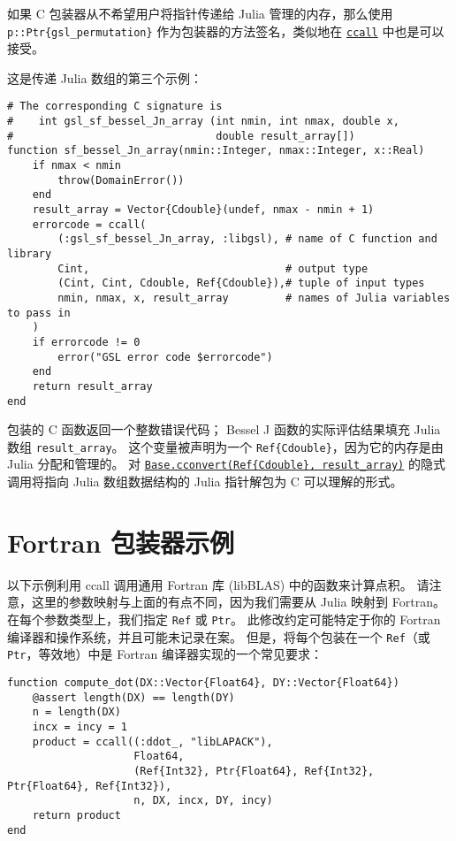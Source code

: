 如果 C 包装器从不希望用户将指针传递给 Julia 管理的内存，那么使用 \texttt{p::Ptr\{gsl\_permutation\}} 作为包装器的方法签名，类似地在 \hyperlink{14245046751182637566}{\texttt{ccall}} 中也是可以接受。



这是传递 Julia 数组的第三个示例：




\begin{verbatim}
# The corresponding C signature is
#    int gsl_sf_bessel_Jn_array (int nmin, int nmax, double x,
#                                double result_array[])
function sf_bessel_Jn_array(nmin::Integer, nmax::Integer, x::Real)
    if nmax < nmin
        throw(DomainError())
    end
    result_array = Vector{Cdouble}(undef, nmax - nmin + 1)
    errorcode = ccall(
        (:gsl_sf_bessel_Jn_array, :libgsl), # name of C function and library
        Cint,                               # output type
        (Cint, Cint, Cdouble, Ref{Cdouble}),# tuple of input types
        nmin, nmax, x, result_array         # names of Julia variables to pass in
    )
    if errorcode != 0
        error("GSL error code $errorcode")
    end
    return result_array
end
\end{verbatim}



包装的 C 函数返回一个整数错误代码； Bessel J 函数的实际评估结果填充 Julia 数组 \texttt{result\_array}。 这个变量被声明为一个 \texttt{Ref\{Cdouble\}}，因为它的内存是由 Julia 分配和管理的。 对 \hyperlink{16487788729383051927}{\texttt{Base.cconvert(Ref\{Cdouble\}, result\_array)}} 的隐式调用将指向 Julia 数组数据结构的 Julia 指针解包为 C 可以理解的形式。



\hypertarget{6854516293199169395}{}


\section{Fortran 包装器示例}



以下示例利用 ccall 调用通用 Fortran 库 (libBLAS) 中的函数来计算点积。 请注意，这里的参数映射与上面的有点不同，因为我们需要从 Julia 映射到 Fortran。 在每个参数类型上，我们指定 \texttt{Ref} 或 \texttt{Ptr}。 此修改约定可能特定于你的 Fortran 编译器和操作系统，并且可能未记录在案。 但是，将每个包装在一个 \texttt{Ref}（或 \texttt{Ptr}，等效地）中是 Fortran 编译器实现的一个常见要求：




\begin{verbatim}
function compute_dot(DX::Vector{Float64}, DY::Vector{Float64})
    @assert length(DX) == length(DY)
    n = length(DX)
    incx = incy = 1
    product = ccall((:ddot_, "libLAPACK"),
                    Float64,
                    (Ref{Int32}, Ptr{Float64}, Ref{Int32}, Ptr{Float64}, Ref{Int32}),
                    n, DX, incx, DY, incy)
    return product
end
\end{verbatim}



